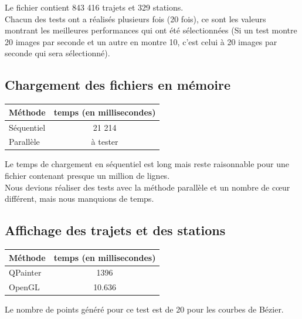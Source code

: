 \documentclass[12pt]{article}
\begin{document}
		Le fichier contient 843 416 trajets et 329 stations. \\
		
		Chacun des tests ont a réalisés plusieurs fois (20 fois), ce
		sont les valeurs montrant les meilleures performances qui ont été
		sélectionnées (Si un test montre 20 images par seconde et un autre en montre
		10, c'est celui à 20 images par seconde qui sera sélectionné).
	    
		\subsection{Chargement des fichiers en mémoire}		
		\begin{center}
			\begin{tabular}{| l | c |}
			\hline
			\textbf{Méthode} & \textbf{temps (en millisecondes)} \\ \hline
			Séquentiel & 21 214 \\ \hline
			Parallèle & à tester \\ \hline
		    \end{tabular}
	    \end{center}
	    
	    Le temps de chargement en séquentiel est long mais reste raisonnable pour une fichier
	    contenant presque un million de lignes.\\
	    Nous devions réaliser des tests avec la méthode parallèle et un nombre de cœur différent,
	    mais nous manquions de temps.
		
		\subsection{Affichage des trajets et des stations}
		\begin{center}
			\begin{tabular}{| l | c |}
			\hline
			\textbf{Méthode} & \textbf{temps (en millisecondes)} \\ \hline
			QPainter & 1396 \\ \hline
			OpenGL & 10.636 \\ \hline
		    \end{tabular}
	    \end{center}
	    
	    Le nombre de points généré pour ce test est de 20 pour les courbes de Bézier.\\
	    	    
\end{document}
